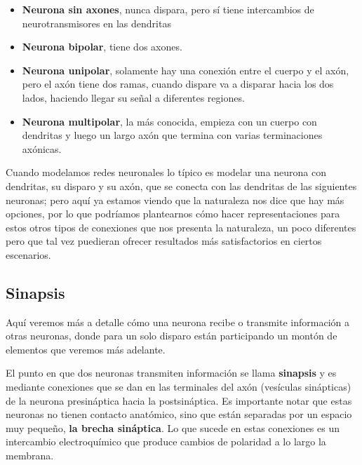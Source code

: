\begin{itemize}
\item \textbf{Neurona sin axones}, nunca dispara, pero sí tiene intercambios de neurotransmisores en las dendritas 
\item \textbf{Neurona bipolar}, tiene dos axones. 
\item \textbf{Neurona unipolar}, solamente hay una conexión entre el cuerpo y el axón, pero el axón tiene dos ramas, cuando dispare va a disparar hacia los dos lados, haciendo llegar su señal a diferentes regiones. 
\item \textbf{Neurona multipolar}, la más conocida, empieza con un cuerpo con dendritas y luego un largo axón que termina con varias terminaciones axónicas.
\end{itemize}


Cuando modelamos redes neuronales lo típico es modelar una neurona con dendritas, su disparo y su axón, que se conecta con las dendritas de las siguientes neuronas; pero aquí ya estamos viendo que la naturaleza nos dice que hay más opciones, por lo que podríamos plantearnos cómo hacer representaciones para estos otros tipos de conexiones que nos presenta la naturaleza, un poco diferentes pero que tal vez puedieran ofrecer resultados más satisfactorios en ciertos escenarios.




\subsection{Sinapsis}


Aquí veremos más a detalle cómo una neurona recibe o transmite información a otras neuronas, donde para un solo disparo están participando un montón de elementos que veremos más adelante.


 El punto en que dos neuronas transmiten información se llama \textbf{sinapsis} y es mediante conexiones que se dan en las terminales del axón (vesículas sinápticas) de la neurona presináptica hacia la postsináptica. Es importante notar que estas neuronas no tienen contacto anatómico, sino que están separadas por un espacio muy pequeño, \textbf{la brecha sináptica}. Lo que sucede en estas conexiones es un intercambio electroquímico que produce cambios de polaridad a lo largo la membrana. 




